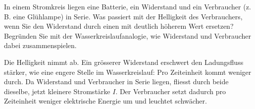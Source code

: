 \begin{questions}
\begin{groupbox}
\end{groupbox}
\end{questions}

\needspace{11cm}
\begin{questions}
\setcounter{question}{6}
\begin{groupbox}
\question[3] In einem Stromkreis liegen eine Batterie, ein Widerstand und
ein Verbraucher (z.\,B. eine Glühlampe) in Serie. Was passiert mit der
Helligkeit des Verbrauchers, wenn Sie den Widerstand durch einen mit
deutlich höherem Wert ersetzen? Begründen Sie mit der
Wasserkreislaufanalogie, wie Widerstand und Verbraucher dabei
zusammenspielen.
\begin{answerbox}
\vspace{2.6cm}
\end{answerbox}
\begin{solution}
Die Helligkeit nimmt ab. Ein grösserer Widerstand erschwert den
Ladungsfluss stärker, wie eine engere Stelle im Wasserkreislauf: Pro
Zeiteinheit kommt weniger durch. Da Widerstand und Verbraucher in Serie
liegen, fliesst durch beide dieselbe, jetzt kleinere Stromstärke $I$. Der
Verbraucher setzt dadurch pro Zeiteinheit weniger elektrische Energie um
und leuchtet schwächer.
\end{solution}
\end{groupbox}
\end{questions}

